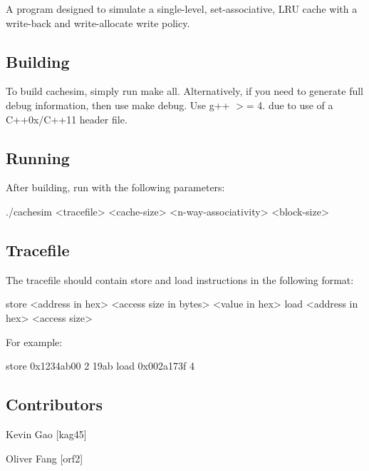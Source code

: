 A program designed to simulate a single-\/level, set-\/associative, L\-R\-U cache with a write-\/back and write-\/allocate write policy.

\subsection*{Building}

To build {\ttfamily cachesim}, simply run {\ttfamily make all}. Alternatively, if you need to generate full debug information, then use {\ttfamily make debug}. Use {\ttfamily g++ $>$= 4.} due to use of a C++0x/\-C++11 header file.

\subsection*{Running}

After building, run with the following parameters\-: \begin{DoxyVerb}./cachesim <tracefile> <cache-size> <n-way-associativity> <block-size>\end{DoxyVerb}
 \subsection*{Tracefile}

The tracefile should contain store and load instructions in the following format\-: \begin{DoxyVerb}store <address in hex> <access size in bytes> <value in hex>
load <address in hex> <access size>\end{DoxyVerb}
 For example\-: \begin{DoxyVerb}store 0x1234ab00 2 19ab
load 0x002a173f 4\end{DoxyVerb}
 \subsection*{Contributors}

Kevin Gao \mbox{[}kag45\mbox{]}

Oliver Fang \mbox{[}orf2\mbox{]} 